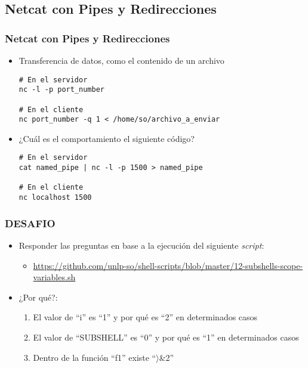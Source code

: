 \subsection{Netcat con Pipes y Redirecciones}
\begin{frame}[fragile]
  \frametitle{Netcat con Pipes y Redirecciones}
  \begin{itemize}
    \item Transferencia de datos, como el contenido de un archivo
      \begin{lstlisting}
# En el servidor      
nc -l -p port_number

# En el cliente
nc port_number -q 1 < /home/so/archivo_a_enviar
      \end{lstlisting}      
    \item ¿Cuál es el comportamiento el siguiente código?
      \begin{lstlisting}
# En el servidor
cat named_pipe | nc -l -p 1500 > named_pipe

# En el cliente
nc localhost 1500
      \end{lstlisting}
  \end{itemize}
\end{frame}

\begin{frame}[fragile]
\frametitle{DESAFIO}
  \begin{itemize}  
    \item Responder las preguntas en base a la ejecución del siguiente \emph{script}:
      \begin{itemize}
        \item \url{https://github.com/unlp-so/shell-scripts/blob/master/12-subshells-scope-variables.sh}
      \end{itemize}
    \item ¿Por qué?:
      \begin{enumerate}
        \item El valor de ``i'' es ``1'' y por qué es ``2'' en determinados casos
        \item El valor de ``SUBSHELL'' es ``0'' y por qué es ``1'' en determinados casos
        \item Dentro de la función ``f1'' existe ``$\rangle$\&2''
      \end{enumerate}
  \end{itemize}
\end{frame}